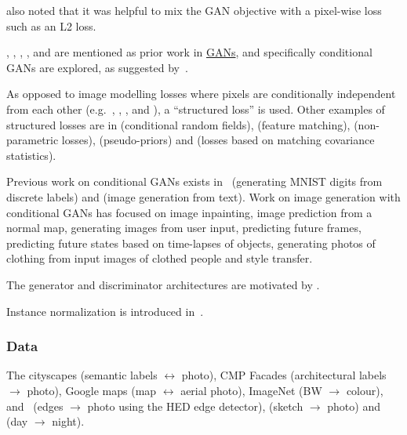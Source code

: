 \documentclass[a4paper, 12pt]{article}
\begin{document}
\cite{DBLP:journals/corr/PathakKDDE16} also noted that it was helpful to mix
the GAN objective with a pixel-wise loss such as an L2 loss.

\cite{NIPS2014_5423}, \cite{DBLP:journals/corr/DentonCSF15},
\cite{DBLP:journals/corr/RadfordMC15},
\cite{DBLP:journals/corr/SalimansGZCRC16}, and
\cite{DBLP:journals/corr/ZhaoML16} are mentioned as prior work in
\hyperref[gan]{GANs}, and specifically conditional GANs are explored, as
suggested by~\cite{NIPS2014_5423}.

As opposed to image modelling losses where pixels are conditionally independent
from each other (e.g.~\cite{DBLP:journals/corr/ShelhamerLD16},
\cite{DBLP:journals/corr/XieT15}, \cite{IizukaSIGGRAPH2016},
\cite{DBLP:journals/corr/LarssonMS16} and \cite{DBLP:journals/corr/ZhangIE16}),
a ``structured loss'' is used. Other examples of structured losses are in
\cite{DBLP:journals/corr/ChenPKMY14} (conditional random fields),
\cite{DBLP:journals/corr/DosovitskiyB16} (feature matching),
\cite{DBLP:journals/corr/LiW16} (non-parametric losses),
\cite{DBLP:journals/corr/XieHT15} (pseudo-priors) and
\cite{DBLP:journals/corr/JohnsonAL16} (losses based on matching covariance
statistics).

Previous work on conditional GANs exists in~\cite{DBLP:journals/corr/MirzaO14}
(generating MNIST digits from discrete labels) and
\cite{DBLP:journals/corr/ReedAYLSL16} (image generation from text). Work on
image generation with conditional GANs has focused on image
inpainting\cite{DBLP:journals/corr/PathakKDDE16}, image prediction from a
normal map\cite{DBLP:journals/corr/WangG16}, generating images from user
input\cite{DBLP:journals/corr/WangG16}, predicting future
frames\cite{DBLP:journals/corr/MathieuCL15}, predicting future states based on
time-lapses of objects\cite{DBLP:journals/corr/ZhouB16b}, generating photos of
clothing from input images of clothed people\cite{DBLP:journals/corr/YooKPPK16}
and style transfer\cite{DBLP:journals/corr/LiW16b}.

The generator and discriminator architectures are motivated by
\cite{DBLP:journals/corr/RadfordMC15}.

Instance normalization is introduced in~\cite{DBLP:journals/corr/UlyanovVL16}.

\subsubsection{Data}

The cityscapes\cite{DBLP:journals/corr/CordtsORREBFRS16} (semantic labels
$\leftrightarrow$ photo), CMP Facades (architectural labels $\rightarrow$
photo), Google maps (map $\leftrightarrow$ aerial photo),
ImageNet\cite{DBLP:journals/corr/RussakovskyDSKSMHKKBBF14} (BW $\rightarrow$
colour), \cite{zhu2016generative} and~\cite{fine-grained} (edges $\rightarrow$
photo using the HED edge detector\cite{DBLP:journals/corr/XieT15}),
\cite{Eitz:2012:HSO:2185520.2185540} (sketch $\rightarrow$ photo) and
\cite{Laffont14} (day $\rightarrow$ night).
\end{document}
